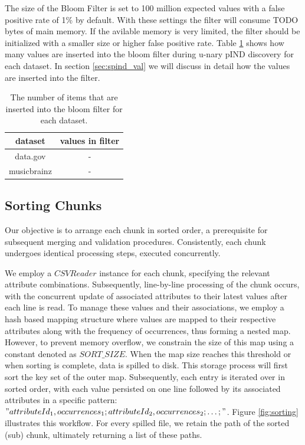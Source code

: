 The size of the Bloom Filter is set to 100 million expected values with a false positive rate of 1\% by default. With these settings the filter will consume TODO bytes of main memory. If the avilable memory is very limited, the filter should be initialized with a smaller size or higher false positive rate. Table \ref{tab:filter} shows how many values are inserted into the bloom filter during u-nary pIND discovery for each dataset. In section \ref{sec:spind_val} we will discuss in detail how the values are inserted into the filter.

\begin{table}
    \label{tab:filter}
    \begin{tabular}{c|c} 
     dataset & values in filter\\ 
     \hline\hline
     data.gov & - \\ 
     \hline
     musicbrainz & - \\
    \end{tabular}
    \caption{The number of items that are inserted into the bloom filter for each dataset.}
\end{table}


\subsection{Sorting Chunks}
Our objective is to arrange each chunk in sorted order, a prerequisite for subsequent merging and validation procedures. Consistently, each chunk undergoes identical processing steps, executed concurrently.

We employ a $CSVReader$ instance for each chunk, specifying the relevant attribute combinations. Subsequently, line-by-line processing of the chunk occurs, with the concurrent update of associated attributes to their latest values after each line is read. To manage these values and their associations, we employ a hash based mapping structure where values are mapped to their respective attributes along with the frequency of occurrences, thus forming a nested map. However, to prevent memory overflow, we constrain the size of this map using a constant denoted as $SORT\_SIZE$. When the map size reaches this threshold or when sorting is complete, data is spilled to disk. This storage process will first sort the key set of the outer map. Subsequently, each entry is iterated over in sorted order, with each value persisted on one line followed by its associated attributes in a specific pattern: $"attributeId_1,occurrences_1;attributeId_2,occurrences_2;\dots;"$. Figure \ref{fig:sorting} illustrates this workflow. For every spilled file, we retain the path of the sorted (sub) chunk, ultimately returning a list of these paths. \\

